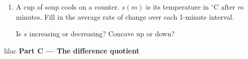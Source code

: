 \documentclass[10pt]{article}
\begin{document}
\begin{enumerate}[leftmargin=1.9em, itemsep=6pt, start=5]
\item A cup of soup cools on a counter. $s(m)$ is its temperature in $^\circ$C after $m$
      minutes. Fill in the average rate of change over each 1-minute interval.

      \par{}
      \vspace{3pt}
      Is $s$ increasing or decreasing? \blank{2.4cm} \qquad Concave up or down? \blank{2.0cm}

\end{enumerate}

\newpage

\begin{headlinebox}{lilac}
\textbf{\color{plum}Part C --- The difference quotient}
\end{headlinebox}
\end{document}
